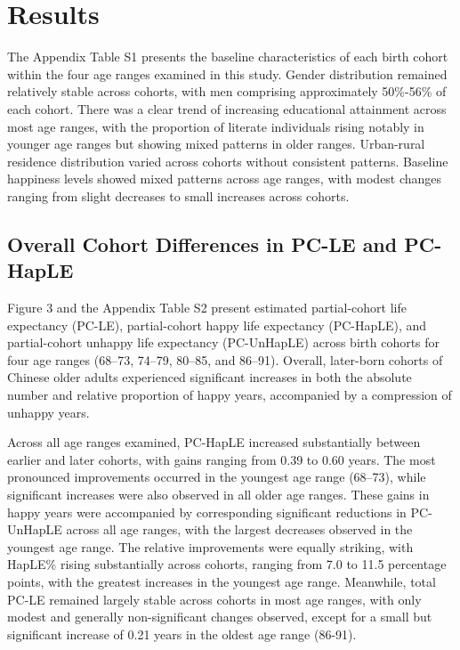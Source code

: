\documentclass[12pt, a4paper]{article}
\begin{document}
\section{Results}
The Appendix Table S1 presents the baseline characteristics of each birth cohort within the four age ranges examined in this study. Gender distribution remained relatively stable across cohorts, with men comprising approximately 50\%-56\% of each cohort. There was a clear trend of increasing educational attainment across most age ranges, with the proportion of literate individuals rising notably in younger age ranges but showing mixed patterns in older ranges. Urban-rural residence distribution varied across cohorts without consistent patterns. Baseline happiness levels showed mixed patterns across age ranges, with modest changes ranging from slight decreases to small increases across cohorts.

\subsection{Overall Cohort Differences in PC-LE and PC-HapLE}

Figure 3 and the Appendix Table S2 present estimated partial-cohort life expectancy (PC-LE), partial-cohort happy life expectancy (PC-HapLE), and partial-cohort unhappy life expectancy (PC-UnHapLE) across birth cohorts for four age ranges (68–73, 74–79, 80–85, and 86–91). Overall, later-born cohorts of Chinese older adults experienced significant increases in both the absolute number and relative proportion of happy years, accompanied by a compression of unhappy years.

Across all age ranges examined, PC-HapLE increased substantially between earlier and later cohorts, with gains ranging from 0.39 to 0.60 years. The most pronounced improvements occurred in the youngest age range (68–73), while significant increases were also observed in all older age ranges. These gains in happy years were accompanied by corresponding significant reductions in PC-UnHapLE across all age ranges, with the largest decreases observed in the youngest age range. The relative improvements were equally striking, with HapLE\% rising substantially across cohorts, ranging from 7.0 to 11.5 percentage points, with the greatest increases in the youngest age range. Meanwhile, total PC-LE remained largely stable across cohorts in most age ranges, with only modest and generally non-significant changes observed, except for a small but significant increase of 0.21 years in the oldest age range (86-91).
\end{document}
